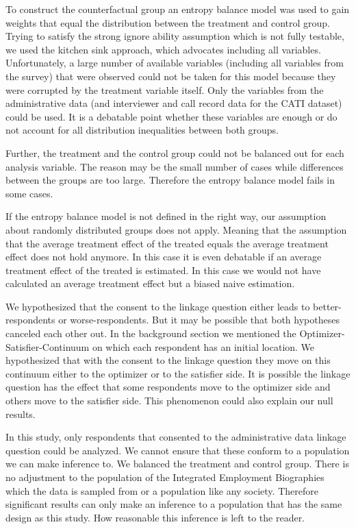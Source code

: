 To construct the counterfactual group an entropy balance model was used to gain weights that equal the distribution between the treatment and control group. Trying to satisfy the strong ignore ability assumption which is not fully testable, we used the kitchen sink approach, which advocates including all variables. Unfortunately, a large number of available variables (including all variables from the survey) that were observed could not be taken for this model because they were corrupted by the treatment variable itself. Only the variables from the administrative data (and interviewer and call record data for the CATI dataset) could be used. It is a debatable point whether these variables are enough or do not account for all distribution inequalities between both groups.

Further, the treatment and the control group could not be balanced out for each analysis variable. The reason may be the small number of cases while differences between the groups are too large. Therefore the entropy balance model fails in some cases.

If the entropy balance model is not defined in the right way, our assumption about randomly distributed groups does not apply. Meaning that the assumption that the average treatment effect of the treated equals the average treatment effect does not hold anymore. In this case it is even debatable if an average treatment effect of the treated is estimated. In this case we would not have calculated an average treatment effect but a biased naive estimation.

We hypothesized that the consent to the linkage question either leads to better-respondents or worse-respondents. But it may be possible that both hypotheses canceled each other out. In the background section we mentioned the Optimizer-Satisfier-Continuum on which each respondent has an initial location. We hypothesized that with the consent to the linkage question they move on this continuum either to the optimizer or to the satisfier side. It is possible the linkage question has the effect that some respondents move to the optimizer side and others move to the satisfier side. This phenomenon could also explain our null results.

In this study, only respondents that consented to the administrative data linkage question could be analyzed. We cannot ensure that these conform to a population we can make inference to. We balanced the treatment and control group. There is no adjustment to the population of the Integrated Employment Biographies which the data is sampled from or a population like any society. Therefore significant results can only make an inference to a population that has the same design as this study. How reasonable this inference is left to the reader.

